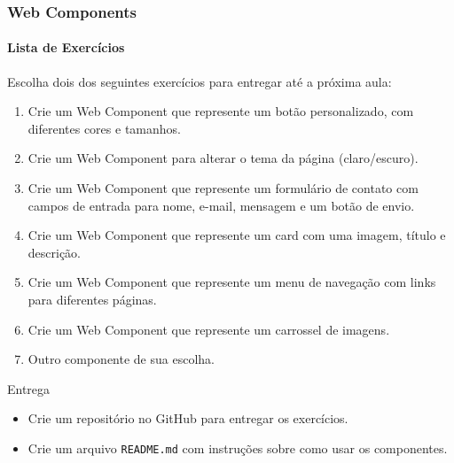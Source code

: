\documentclass[
	9pt, %
	t, %
]{beamer}
\begin{document}
\begin{frame}
	\frametitle{Web Components}
	\framesubtitle{Lista de Exercícios}

	Escolha dois dos seguintes exercícios para entregar até a próxima aula:

	\begin{enumerate}
		\item Crie um Web Component que represente um botão personalizado, com diferentes cores e tamanhos.
		\item Crie um Web Component para alterar o tema da página (claro/escuro).
		\item Crie um Web Component que represente um formulário de contato com campos de entrada para nome, e-mail, mensagem e um botão de envio.
		\item Crie um Web Component que represente um card com uma imagem, título e descrição.
		\item Crie um Web Component que represente um menu de navegação com links para diferentes páginas.
		\item Crie um Web Component que represente um carrossel de imagens.
		\item Outro componente de sua escolha.
	\end{enumerate}

	\begin{block}{Entrega}
		\begin{itemize}
			\item Crie um repositório no GitHub para entregar os exercícios.
			\item Crie um arquivo \texttt{README.md} com instruções sobre como usar os componentes.
		\end{itemize}
	\end{block}

\end{frame}
\end{document}
